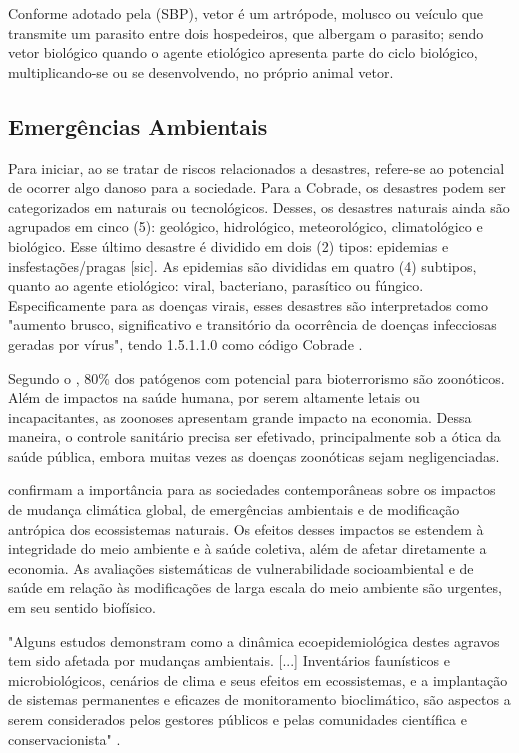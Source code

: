 \indent Conforme adotado pela  (\acrshort{SBP}), vetor é um artrópode, molusco ou veículo que transmite um parasito entre dois hospedeiros, que albergam o parasito; sendo vetor biológico quando o agente etiológico apresenta parte do ciclo biológico, multiplicando-se ou se desenvolvendo, no próprio animal vetor.

\subsection{Emergências Ambientais}

\indent Para iniciar, ao se tratar de riscos relacionados a desastres, refere-se ao
potencial de ocorrer algo danoso para a sociedade. Para a \acrfull{Cobrade}, os desastres podem ser categorizados em naturais ou tecnológicos. Desses, os desastres naturais ainda são agrupados em cinco (5): geológico, hidrológico, meteorológico, climatológico e biológico. Esse último desastre é dividido em dois (2) tipos: epidemias e insfestações/pragas [sic]. As epidemias são divididas em quatro (4) subtipos,  quanto ao agente etiológico: viral, bacteriano, parasítico ou fúngico. Especificamente para as doenças virais, esses desastres são interpretados como "aumento brusco, significativo e transitório da ocorrência de doenças infecciosas geradas por vírus", tendo 1.5.1.1.0 como código \acrshort{Cobrade} \cite{GIRD}.

\indent Segundo o , 80\% dos patógenos com potencial para bioterrorismo são zoonóticos. Além de impactos na saúde humana, por serem altamente letais ou incapacitantes, as zoonoses apresentam grande impacto na economia. Dessa maneira, o controle sanitário precisa ser efetivado, principalmente sob a ótica da saúde pública, embora muitas vezes as doenças zoonóticas sejam negligenciadas.

\indent {} confirmam a importância para as sociedades contemporâneas sobre os impactos de mudança climática global, de emergências ambientais e de modificação antrópica dos ecossistemas naturais. Os efeitos desses impactos se estendem à integridade do meio ambiente e à saúde coletiva, além de afetar diretamente a economia. As avaliações sistemáticas de vulnerabilidade socioambiental e de saúde em relação às modificações de larga escala do meio ambiente são urgentes, em seu sentido biofísico. 

\begin{citacao}
"Alguns estudos demonstram como a dinâmica ecoepidemiológica destes agravos tem sido afetada por mudanças ambientais. [...] Inventários faunísticos e microbiológicos, cenários de clima e seus efeitos em ecossistemas, e a implantação de sistemas permanentes e eficazes de monitoramento bioclimático, são aspectos a serem considerados pelos gestores públicos e pelas comunidades científica e conservacionista" \cite[pg-2325]{Cubas2014Tratado}.
\end{citacao}

